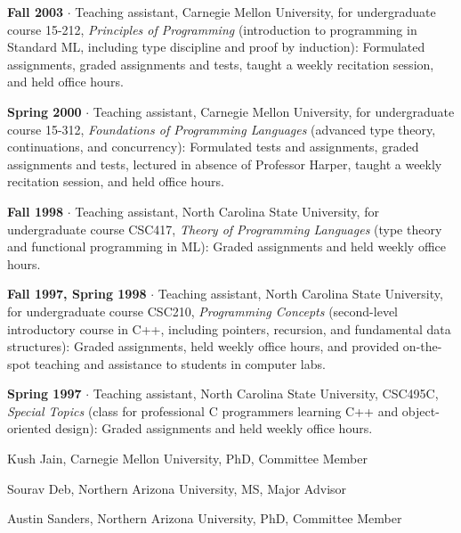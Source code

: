 \documentclass[ComputerScience]{vita}
\begin{document}
\begin{vita}
\begin{Teaching}
   \item {\bf Fall 2003} $\cdot$ Teaching assistant, Carnegie Mellon
   University, for undergraduate course 15-212, \emph{Principles of
   Programming} (introduction to programming in Standard ML, including type
   discipline and proof by induction): Formulated assignments, graded
   assignments and tests, taught a weekly recitation session, and held
   office hours.

   \item {\bf Spring 2000} $\cdot$ Teaching assistant, Carnegie Mellon
   University, for undergraduate course 15-312, \emph{Foundations of
   Programming Languages} (advanced type theory, continuations, and concurrency): Formulated tests and assignments, graded
   assignments and tests, lectured in absence of Professor Harper,
   taught a weekly recitation session, and held office hours.

   \item {\bf Fall 1998} $\cdot$ Teaching assistant, North Carolina
   State University, for undergraduate course CSC417, \emph{Theory of
   Programming Languages} (type theory and functional programming in ML):
   Graded assignments and held weekly office hours.

   \item {\bf Fall 1997, Spring 1998} $\cdot$ Teaching assistant,
   North Carolina State University, for undergraduate course CSC210,
   {\em Programming Concepts} (second-level introductory course in
   C++, including pointers, recursion, and fundamental data
   structures): Graded assignments, held weekly office hours, and
   provided on-the-spot teaching and assistance to students in
   computer labs.

   \item {\bf Spring 1997} $\cdot$ Teaching assistant, North
   Carolina State University, CSC495C, {\em
   Special Topics} (class for professional C programmers learning C++ and object-oriented design):  Graded assignments and held weekly office
   hours.

\end{Teaching}

\begin{Current Students}
\item Kush Jain, Carnegie Mellon University, PhD, Committee Member
\item Sourav Deb, Northern Arizona University, MS, Major Advisor
\item Austin Sanders, Northern Arizona University, PhD, Committee Member
\end{Current Students}


\end{vita}
\end{document}
